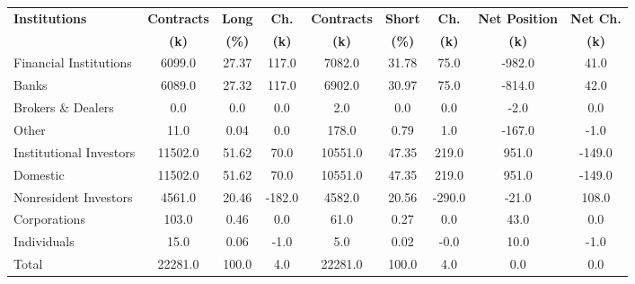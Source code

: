 \documentclass[article,crop=false]{standalone}%
\begin{document}
%
\normalsize%
\setlength{\tabcolsep}{0.15cm}%
\begin{tabular}[h]{l | c c c | c c c | c c}%
\hline%
\rowcolor{white}%
\textbf{Institutions}&\textbf{Contracts}&\textbf{Long}&\textbf{Ch.}&\textbf{Contracts}&\textbf{Short}&\textbf{Ch.}&\textbf{Net Position}&\textbf{Net Ch.}\\%
\rowcolor{white}%
\textbf{}&\textbf{(k)}&\textbf{(\%)}&\textbf{(k)}&\textbf{(k)}&\textbf{(\%)}&\textbf{(k)}&\textbf{(k)}&\textbf{(k)}\\%
\hline%
\rowcolor{lightgray}%
Financial Institutions&6099.0&27.37&117.0&7082.0&31.78&75.0&{-}982.0&41.0\\%
\rowcolor{white}%
Banks&6089.0&27.32&117.0&6902.0&30.97&75.0&{-}814.0&42.0\\%
\rowcolor{lightgray}%
Brokers \& Dealers&0.0&0.0&0.0&2.0&0.0&0.0&{-}2.0&0.0\\%
\rowcolor{white}%
Other&11.0&0.04&0.0&178.0&0.79&1.0&{-}167.0&{-}1.0\\%
\rowcolor{lightgray}%
Institutional Investors&11502.0&51.62&70.0&10551.0&47.35&219.0&951.0&{-}149.0\\%
\rowcolor{white}%
Domestic&11502.0&51.62&70.0&10551.0&47.35&219.0&951.0&{-}149.0\\%
\rowcolor{lightgray}%
Nonresident Investors&4561.0&20.46&{-}182.0&4582.0&20.56&{-}290.0&{-}21.0&108.0\\%
\rowcolor{white}%
Corporations&103.0&0.46&0.0&61.0&0.27&0.0&43.0&0.0\\%
\rowcolor{lightgray}%
Individuals&15.0&0.06&{-}1.0&5.0&0.02&{-}0.0&10.0&{-}1.0\\%
\rowcolor{white}%
Total&22281.0&100.0&4.0&22281.0&100.0&4.0&0.0&0.0\\%
\hline%
\end{tabular}%
\end{document}
